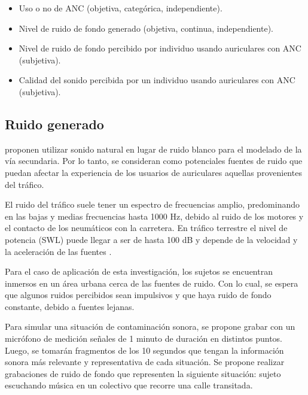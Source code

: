 \documentclass[a4paper,12pt]{article}
\begin{document}
\begin{itemize}[label=\textbullet]
    \item Uso o no de ANC (objetiva, categórica, independiente).

    \item Nivel de ruido de fondo generado (objetiva, continua, independiente).

    \item Nivel de ruido de fondo percibido por individuo usando auriculares con ANC (subjetiva).

    \item Calidad del sonido percibida por un individuo usando auriculares con ANC (subjetiva).
\end{itemize}

\subsection{Ruido generado}
\label{sec:generatedNoise}

\textcite[][3]{Kuo2018} proponen utilizar sonido natural en lugar de ruido blanco para el modelado de la vía secundaria.
Por lo tanto, se consideran como potenciales fuentes de ruido que puedan afectar la experiencia de los usuarios de auriculares aquellas provenientes del tráfico.

El ruido del tráfico suele tener un espectro de frecuencias amplio, predominando en las bajas y medias frecuencias hasta 1000 $\si{\hertz}$, debido al ruido de los motores y el contacto de los neumáticos con la carretera.
En tráfico terrestre el nivel de potencia (SWL) puede llegar a ser de hasta 100 \si{\deci \bel} y depende de la velocidad y la aceleración de las fuentes \parencite{Can2010}.

Para el caso de aplicación de esta investigación, los sujetos se encuentran inmersos en un área urbana cerca de las fuentes de ruido.
Con lo cual, se espera que algunos ruidos percibidos sean impulsivos y que haya ruido de fondo constante, debido a fuentes lejanas.

Para simular una situación de contaminación sonora, se propone grabar con un micrófono de medición señales de 1 minuto de duración en distintos puntos. Luego, se tomarán fragmentos de los 10 segundos que tengan la información sonora más relevante y representativa de cada situación.
Se propone realizar grabaciones de ruido de fondo que representen la siguiente situación: sujeto escuchando música en un colectivo que recorre una calle transitada.
\end{document}
